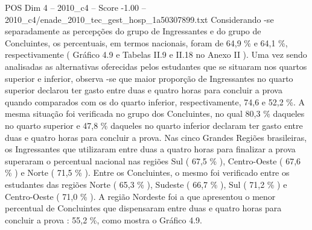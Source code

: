 \begin{textsample}{POS Dim 4 – 2010\_c4 – Score -1.00 – 2010\_c4/enade\_2010\_tec\_gest\_hosp\_1a50307899.txt}
Considerando -se separadamente as percepções do grupo de Ingressantes e do grupo de Concluintes, os percentuais, em termos nacionais, foram de 64,9 \% e 64,1 \%, respectivamente ( Gráfico 4.9 e Tabelas II.9 e II.18 no Anexo II ).
Uma vez sendo analisadas as alternativas oferecidas pelos estudantes que se situaram nos quartos superior e inferior, observa -se que maior proporção de Ingressantes no quarto superior declarou ter gasto entre duas e quatro horas para concluir a prova quando comparados com os do quarto inferior, respectivamente, 74,6 e 52,2 \%.
A mesma situação foi verificada no grupo dos Concluintes, no qual 80,3 \% daqueles no quarto superior e 47,8 \% daqueles no quarto inferior declaram ter gasto entre duas e quatro horas para concluir a prova.
Nas cinco Grandes Regiões brasileiras, os Ingressantes que utilizaram entre duas a quatro horas para finalizar a prova superaram o percentual nacional nas regiões Sul ( 67,5 \% ), Centro-Oeste ( 67,6 \% ) e Norte ( 71,5 \% ).
Entre os Concluintes, o mesmo foi verificado entre os estudantes das regiões Norte ( 65,3 \% ), Sudeste ( 66,7 \% ), Sul ( 71,2 \% ) e Centro-Oeste ( 71,0 \% ).
A região Nordeste foi a que apresentou o menor percentual de Concluintes que dispensaram entre duas e quatro horas para concluir a prova : 55,2 \%, como mostra o Gráfico 4.9.

\end{textsample}
